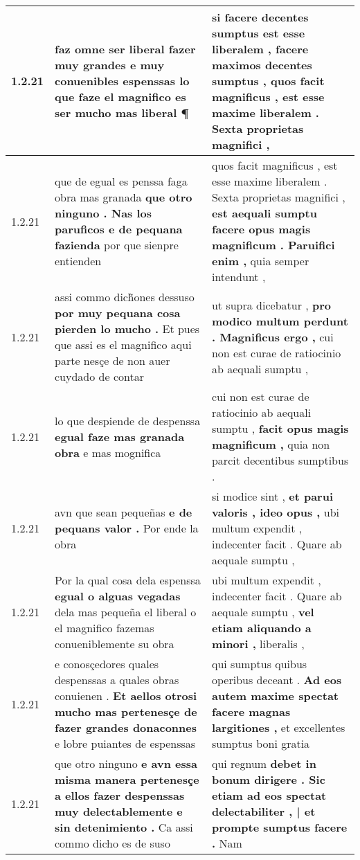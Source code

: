 \begin{tabular}{|p{1cm}|p{6.5cm}|p{6.5cm}|}
1.2.21 & faz omne ser liberal fazer muy grandes \textbf{ e muy conuenibles espenssas } lo que faze el magnifico es ser mucho mas liberal ¶ & si facere decentes sumptus est esse liberalem , \textbf{ facere maximos decentes sumptus , } quos facit magnificus , est esse maxime liberalem . Sexta proprietas magnifici , \\\hline
1.2.21 & que de egual es penssa faga obra mas granada \textbf{ que otro ninguno . Nas los paruficos e de pequana fazienda } por que sienpre entienden & quos facit magnificus , est esse maxime liberalem . Sexta proprietas magnifici , \textbf{ est aequali sumptu facere opus magis magnificum . Paruifici enim , } quia semper intendunt , \\\hline
1.2.21 & assi commo dich̃ones dessuso \textbf{ por muy pequana cosa pierden lo mucho . } Et pues que assi es el magnifico aqui parte nesçe de non auer cuydado de contar & ut supra dicebatur , \textbf{ pro modico multum perdunt . Magnificus ergo , } cui non est curae de ratiocinio ab aequali sumptu , \\\hline
1.2.21 & lo que despiende de despenssa \textbf{ egual faze mas granada obra } e mas mognifica & cui non est curae de ratiocinio ab aequali sumptu , \textbf{ facit opus magis magnificum , } quia non parcit decentibus sumptibus . \\\hline
1.2.21 & avn que sean pequeñas \textbf{ e de pequans valor . } Por ende la obra & si modice sint , \textbf{ et parui valoris , ideo opus , } ubi multum expendit , indecenter facit . Quare ab aequale sumptu , \\\hline
1.2.21 & Por la qual cosa dela espenssa \textbf{ egual o alguas vegadas } dela mas pequeña el liberal o el magnifico fazemas conueniblemente su obra & ubi multum expendit , indecenter facit . Quare ab aequale sumptu , \textbf{ vel etiam aliquando a minori , } liberalis , \\\hline
1.2.21 & e conosçedores quales despenssas a quales obras conuienen . \textbf{ Et aellos otrosi mucho mas pertenesçe de fazer grandes donaconnes } e lobre puiantes de espenssas & qui sumptus quibus operibus deceant . \textbf{ Ad eos autem maxime spectat facere magnas largitiones , } et excellentes sumptus boni gratia \\\hline
1.2.21 & que otro ninguno \textbf{ e avn essa misma manera pertenesçe a ellos fazer despenssas muy delectablemente e sin detenimiento . } Ca assi commo dicho es de suso & qui regnum \textbf{ debet in bonum dirigere . Sic etiam ad eos spectat delectabiliter , | et prompte sumptus facere . } Nam \\\hline

\end{tabular}
